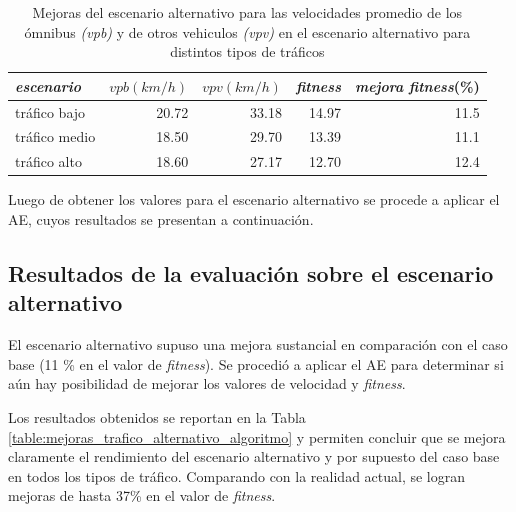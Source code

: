 \begin{table}[H]
	\renewcommand{\arraystretch}{1}
	\renewcommand{\tabcolsep}{12pt}	
	\caption[Mejoras del escenario alternativo.]{Mejoras del escenario alternativo para las velocidades promedio de los ómnibus \textit{(vpb)} y de otros vehiculos \textit{(vpv)} en el escenario alternativo para distintos tipos de tráficos }
	\label{table:mejoras_trafico_alternativo}
	\centering
	\begin{tabular}{lrrrr }
		\toprule
		\textit{escenario}&
		\textit{$vpb(km/h)$}& 
		\textit{$vpv(km/h)$} & 
		\textit{fitness} &
		\textit{mejora } \newline \textit{fitness}(\%)
		\\ 
		\midrule
		tráfico bajo & 20.72  & 33.18 & 14.97 & 11.5\\
		tráfico medio & 18.50  & 29.70& 13.39 & 11.1 \\
		tráfico alto  & 18.60  & 27.17& 12.70 & 12.4\\		
		\bottomrule
	\end{tabular}
\end{table}


Luego de obtener los valores para el escenario alternativo se procede a aplicar el AE, cuyos resultados se presentan a continuación.


\subsection{Resultados de la evaluación sobre el escenario alternativo}

El escenario alternativo supuso una mejora sustancial en comparación con el caso base (11 \% en el valor de \emph{fitness}). Se procedió a aplicar el AE para determinar si aún hay posibilidad de mejorar los valores de velocidad y \emph{fitness}.

Los resultados obtenidos se reportan en la Tabla \ref{table:mejoras_trafico_alternativo_algoritmo} y permiten concluir que se mejora claramente el rendimiento del escenario alternativo y por supuesto del caso base en todos los tipos de tráfico. Comparando con la realidad actual, se logran mejoras de hasta 37\% en el valor de \emph{fitness}. 


